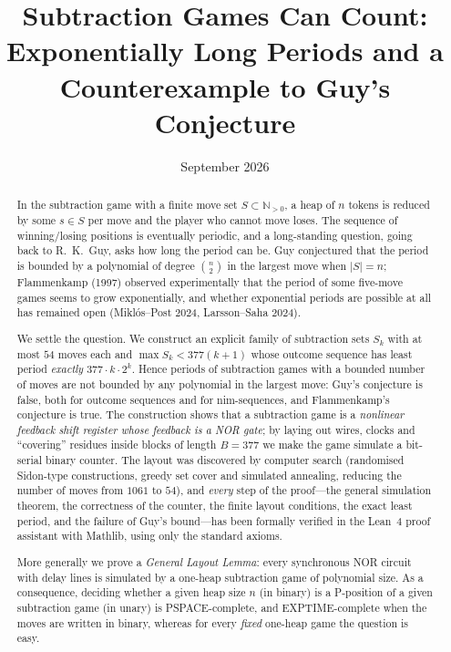 \documentclass[11pt]{article}
\title{Subtraction Games Can Count:\\ Exponentially Long Periods and a Counterexample to Guy's Conjecture}
\author{}
\date{September 2026}
\theoremstyle{definition}
\newcommand{\N}{\mathbb{N}}
\begin{document}
\maketitle

\begin{abstract}
In the subtraction game with a finite move set $S\subset\N_{>0}$, a heap of $n$ tokens is reduced
by some $s\in S$ per move and the player who cannot move loses.  The sequence of winning/losing
positions is eventually periodic, and a long-standing question, going back to R.~K.~Guy, asks how
long the period can be.  Guy conjectured that the period is bounded by a polynomial of degree
$\binom{n}{2}$ in the largest move when $|S|=n$; Flammenkamp (1997) observed experimentally that
the period of some five-move games seems to grow exponentially, and whether exponential periods
are possible at all has remained open (Miklós--Post 2024, Larsson--Saha 2024).

We settle the question.  We construct an explicit family of subtraction sets $S_k$ with at most
$54$ moves each and $\max S_k< 377(k+1)$ whose outcome sequence has least period
\emph{exactly} $377\cdot k\cdot 2^{k}$.  Hence periods of subtraction games with a bounded number of
moves are not bounded by any polynomial in the largest move: Guy's conjecture is false, both for
outcome sequences and for nim-sequences, and Flammenkamp's conjecture is true.  The construction
shows that a subtraction game is a \emph{nonlinear feedback shift register whose feedback is a NOR
gate}; by laying out wires, clocks and ``covering'' residues inside blocks of length $B=377$ we make
the game simulate a bit-serial binary counter.  The layout was discovered by computer search
(randomised Sidon-type constructions, greedy set cover and simulated annealing, reducing the
number of moves from $1061$ to $54$), and \emph{every} step of the proof---the general simulation
theorem, the correctness of the counter, the finite layout conditions, the exact least period, and
the failure of Guy's bound---has been formally verified in the Lean~4 proof assistant with
Mathlib, using only the standard axioms.

More generally we prove a \emph{General Layout Lemma}: every synchronous NOR circuit with delay
lines is simulated by a one-heap subtraction game of polynomial size.  As a consequence, deciding
whether a given heap size $n$ (in binary) is a P-position of a given subtraction game (in unary) is
PSPACE-complete, and EXPTIME-complete when the moves are written in binary, whereas for every
\emph{fixed} one-heap game the question is easy.
\end{abstract}
\end{document}
